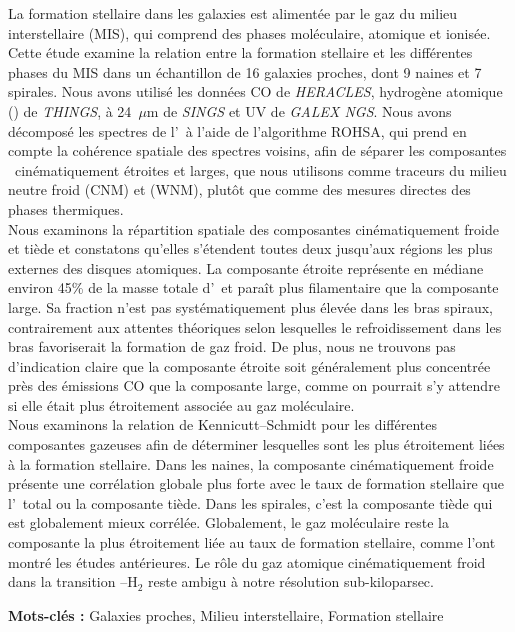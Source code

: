 \vspace{-0.1em}
	La formation stellaire dans les galaxies est alimentée par le gaz du milieu interstellaire (MIS), qui comprend des phases moléculaire, atomique et ionisée. Cette étude examine la relation entre la formation stellaire et les différentes phases du MIS dans un échantillon de 16 galaxies proches, dont 9 naines et 7 spirales.
	Nous avons utilisé les données CO de \textit{HERACLES}, hydrog\`ene atomique (\HI) de \textit{THINGS}, à 24~$\mu$m de \textit{SINGS} et UV de \textit{GALEX NGS}. Nous avons décomposé les spectres de l'\HI\ à l'aide de l'algorithme ROHSA, qui prend en compte la cohérence spatiale des spectres voisins, afin de séparer les composantes \HI\ cinématiquement étroites et larges, que nous utilisons comme traceurs du milieu neutre froid (CNM) et  (WNM), plutôt que comme des mesures directes des phases thermiques.\\
	Nous examinons la répartition spatiale des composantes cinématiquement froide et tiède et constatons qu'elles s'étendent toutes deux jusqu'aux régions les plus externes des disques atomiques. La composante étroite représente en médiane environ 45\% de la masse totale d'\HI\ et paraît plus filamentaire que la composante large. Sa fraction n'est pas systématiquement plus élevée dans les bras spiraux, contrairement aux attentes théoriques selon lesquelles le refroidissement dans les bras favoriserait la formation de gaz froid. De plus, nous ne trouvons pas d'indication claire que la composante étroite soit généralement plus concentrée près des émissions CO que la composante large, comme on pourrait s'y attendre si elle était plus étroitement associée au gaz moléculaire.\\
	Nous examinons la relation de Kennicutt--Schmidt pour les différentes composantes gazeuses afin de déterminer lesquelles sont les plus étroitement liées à la formation stellaire. Dans les naines, la composante cinématiquement froide présente une corrélation globale plus forte avec le taux de formation stellaire que l'\HI\ total ou la composante tiède. Dans les spirales, c'est la composante tiède qui est globalement mieux corrélée. Globalement, le gaz moléculaire reste la composante la plus étroitement liée au taux de formation stellaire, comme l'ont montré les études antérieures. Le rôle du gaz atomique cinématiquement froid dans la transition \HI--H$_2$ reste ambigu à notre résolution sub-kiloparsec.

\noindent\textbf{Mots-clés :} Galaxies proches, Milieu interstellaire, Formation stellaire
\newpage